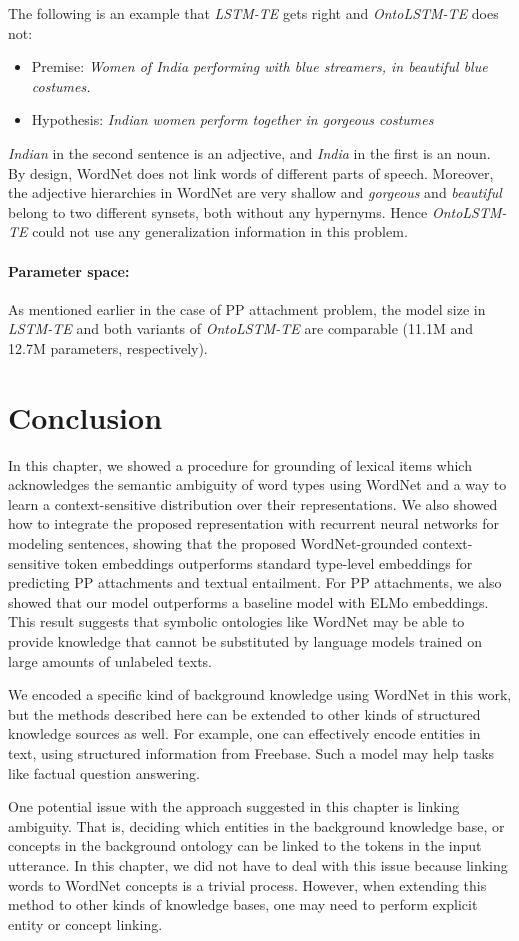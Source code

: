 The following is an example that \textit{LSTM-TE} gets right and \textit{OntoLSTM-TE} does not:
\begin{itemize}
 \item Premise: \textit{Women of India performing with blue streamers, in 
beautiful blue costumes.}
 \item Hypothesis: \textit{Indian women perform together in gorgeous costumes}
\end{itemize}
\textit{Indian} in the second sentence is an adjective, and \textit{India} in 
the first is an noun. By design, WordNet does not link words of different parts 
of speech. Moreover, the adjective hierarchies in WordNet are very shallow and 
\textit{gorgeous} and \textit{beautiful} belong to two different synsets, both 
without any hypernyms. Hence \textit{OntoLSTM-TE} could not use any generalization 
information in this problem.

\paragraph{Parameter space:} As mentioned earlier in the case of PP attachment problem,
the model size in \textit{LSTM-TE} and both variants of \textit{OntoLSTM-TE} are comparable
(11.1M and 12.7M parameters, respectively).

\section{Conclusion}
In this chapter, we showed a procedure for grounding of lexical items which acknowledges the semantic ambiguity 
of word types using WordNet and a way to learn a context-sensitive distribution over their representations.
We also showed how to integrate the proposed representation with recurrent neural networks for modeling sentences,
showing that the proposed WordNet-grounded context-sensitive token embeddings outperforms standard type-level embeddings
for predicting PP attachments and textual entailment. For PP attachments, we
also showed that our model outperforms a baseline model with ELMo embeddings.
This result suggests that symbolic ontologies like WordNet may be able to
provide knowledge that cannot be substituted by language models trained on large
amounts of unlabeled texts.

We encoded a specific kind of background knowledge using WordNet in this work, but the methods described here can be extended 
to other kinds of structured knowledge sources as well. For example, one can effectively encode entities in text, using structured information
from Freebase. Such a model may help tasks like factual question answering.

One potential issue with the approach suggested in this chapter is
linking ambiguity. That is, deciding which entities in the background knowledge base, or concepts in the background ontology can be linked to
the tokens in the input utterance. In this chapter, we did not have to deal with this issue because linking words to WordNet concepts is a
trivial process. However, when extending this method to other kinds of knowledge bases, one may need to perform explicit entity or concept linking.
